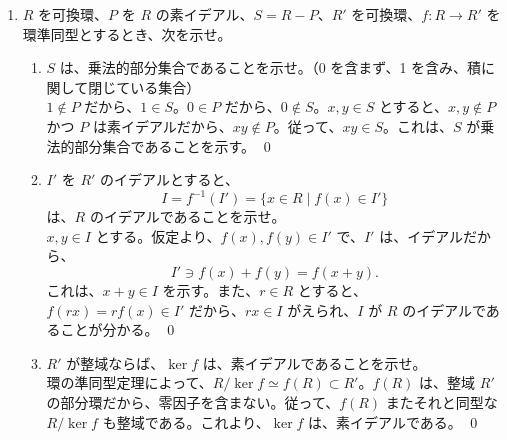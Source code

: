 \begin{enumerate}
\begin{enumerate}
     \item $R$ を整域と仮定するとき、$U(R[x]) = U(R)$ であることを示せ。\\
     \sol
     $f(x), g(x)\in R[x]$ とし、$\deg f(x)g(x) = 1$ とすると、
     $$0 = \deg 1 = \deg f(x)g(x) = \deg f(x) + \deg g(x)$$
     だから、$\deg f(x) = \deg g(x) = 0$。これより、$f(x), g(x) \in R$ を得る。従って、$U(R[x])\subset U(R)$。$U(R)\subset U(R[x])$ は明らかだから $U(R[x]) = U(R)$ を得る。
     \qed
     
     \item $R$ を整域とは仮定しないとき、$U(R[x]) = U(R)$ か。正しければ証明し、正しくなければ、反例を上げよ。\\
     \sol
     $R = \bZ_4$、$f(x) = 2x+1$ とする。
     $$(f(x))^2 = (2x+1)(2x+1) = 4x^2 + 4x + 1 = 1$$
     だから、$2x+1\in U(R[x])$。しかし、$2x+1\not\in R$ だから、$U(R[x]) \neq U(R)$ しかし $2x+1\not\in R$。
     \qed
     \end{enumerate}
 
\item $R$ を可換環、$P$ を $R$ の素イデアル、$S = R - P$、$R'$ を可換環、$f:R\to R'$ を環準同型とするとき、次を示せ。
     \begin{enumerate}
     \item $S$ は、乗法的部分集合であることを示せ。（0 を含まず、1 を含み、積に関して閉じている集合）\\
     \sol
     $1\not\in P$ だから、$1\in S$。$0\in P$ だから、$0\not\in S$。$x,y\in S$ とすると、$x,y\not\in P$ かつ $P$ は素イデアルだから、$xy\not\in P$。従って、$xy\in S$。これは、$S$ が乗法的部分集合であることを示す。
     \qed
     
     \item $I'$ を $R'$ のイデアルとすると、
     $$I = f^{-1}(I') = \{x\in R\mid f(x)\in I'\}$$
     は、$R$ のイデアルであることを示せ。\\
     \sol
     $x,y\in I$ とする。仮定より、$f(x), f(y)\in I'$ で、$I'$ は、イデアルだから、
     $$I'\ni f(x) + f(y) = f(x+y).$$
     これは、$x+y\in I$ を示す。また、$r\in R$ とすると、$f(rx) = rf(x)\in I'$ だから、$rx\in I$ がえられ、$I$ が $R$ のイデアルであることが分かる。
     \qed
     
     \item $R'$ が整域ならば、$\ker f$ は、素イデアルであることを示せ。\\
     \sol
     環の準同型定理によって、$R/\ker f\simeq f(R) \subset R'$。$f(R)$ は、整域 $R'$ の部分環だから、零因子を含まない。従って、$f(R)$ またそれと同型な $R/\ker f$ も整域である。これより、$\ker f$ は、素イデアルである。
     \qed
     

\end{enumerate}
\end{enumerate}
